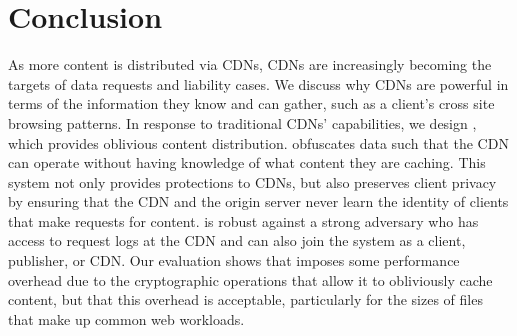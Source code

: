 \section{Conclusion}
\label{sec:conclusion}

As more content is distributed via CDNs, CDNs are increasingly becoming the
targets of data requests and liability cases.  We discuss why CDNs are
powerful in terms of the information they know  and can gather, such as a
client's cross site browsing patterns.  In response to  traditional CDNs'
capabilities, we design \system{}, which provides oblivious content
distribution.  \system{} obfuscates data such that the CDN can operate without
having knowledge of  what content they are caching.  This system not only
provides protections to CDNs, but also preserves client privacy by ensuring
that the CDN and the origin server never learn the identity of clients that
make requests for content. \system{} is robust against a strong adversary who
has access to request logs at the CDN and can also join the system as a
client, publisher, or CDN. Our evaluation shows that \system{} imposes some performance
overhead due to the cryptographic operations that allow it to obliviously cache
content, but that this overhead is acceptable, particularly for the sizes of files
that make up common web workloads.
